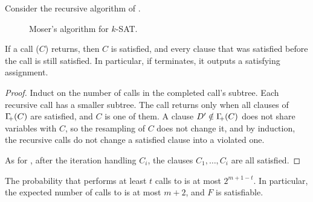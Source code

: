 Consider the recursive algorithm of .

\begin{figure}[h]
    \centerline{%
    }
    \caption{Moser's algorithm for $k$-SAT.}
\end{figure}

\begin{lemma}
    If a call \FixAlg{}($C$) returns, then $C$ is satisfied, and every
    clause that was satisfied before the call is still satisfied. In
    particular, if \SolveAlg terminates, it outputs a satisfying
    assignment.
\end{lemma}

\begin{proof}
    Induct on the number of calls in the completed call's subtree.
    Each recursive call has a smaller subtree. The call returns only
    when all clauses of $\NbrCX{C}$ are satisfied, and $C$ is one of
    them. A clause $D' \notin \NbrCX{C}$ does not share variables
    with $C$, so the resampling of $C$ does not change it, and by
    induction, the recursive calls do not change a satisfied clause
    into a violated one.

    As for \SolveAlg, after the iteration handling $C_i$, the clauses
    $C_1, \ldots, C_i$ are all satisfied.
\end{proof}

\begin{theorem}
    The probability that \SolveAlg performs at least $t$ calls to
    \FixAlg is at most $2^{m+1-t}$. In particular, the expected number
    of calls to \FixAlg is at most $m+2$, and $F$ is satisfiable.
\end{theorem}

